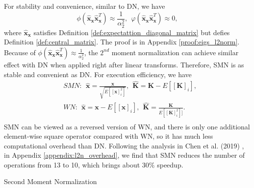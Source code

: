 \documentclass[10pt,journal,compsoc]{IEEEtran}
\newcommand{\modify}[1]{{ #1}}
\begin{document}
For stability and convenience, similar to DN, we have
\begin{equation}
    \phi\left(\hat{\mathbf{x}}_{\mathbf{x}}\hat{\mathbf{x}}_{\mathbf{x}}^T\right) \approx \frac{1}{\alpha_2^2},~~\varphi\left(\hat{\mathbf{x}}_{\mathbf{x}}\hat{\mathbf{x}}_{\mathbf{x}}^T\right) \approx 0,
\label{equ:eigs_l2norm}
\end{equation}
where $\hat{\mathbf{x}}_{\mathbf{x}}$ satisfies Definition \ref{def:expectattion_diagonal_matrix} but defies Definition \ref{def:central_matrix}. The proof is in Appendix \ref{proof:eigs_l2norm}. Because of $\phi(\hat{\mathbf{x}}_{\mathbf{x}}\hat{\mathbf{x}}_{\mathbf{x}}^T) \approx \frac{1}{\alpha_2^2}$, the $2^{nd}$ moment normalization can achieve similar effect with DN when applied right after linear transforms. Therefore, SMN is as stable and convenient as DN. For execution efficiency, we have
\begin{equation}
\begin{split}
    & SMN:~~\hat{\mathbf{x}} = \frac{\mathbf{x}}{\sqrt{E\left[[\mathbf{x}]_i^2\right]}},~~\hat{\mathbf{K}} = \mathbf{K} - E[[\mathbf{K}]_i],\\
    & WN:~~\hat{\mathbf{x}} = \mathbf{x} - E\left[[\mathbf{x}]_i\right],~~\hat{\mathbf{K}} = \frac{\mathbf{K}}{E[[\mathbf{K}]_i^2]]}.\\
\end{split}
\label{equ:compare_wn_smn}
\end{equation}
SMN can be viewed as a reversed version of WN, and there is only one additional element-wise square operator compared with WN, so it has much less computational overhead than DN. \modify{Following the analysis in Chen et al. (2019) \cite{chen2019effective}, in Appendix \ref{appendix:l2n_overhead}, we find that SMN reduces the number of operations from 13 to 10, which brings about $30\%$ speedup.}
\vspace{-10pt}
\begin{algorithm}[ht]
\DontPrintSemicolon
 \caption{Second Moment Normalization}
 \label{Alg:smn_alg}
\end{algorithm}
\end{document}
